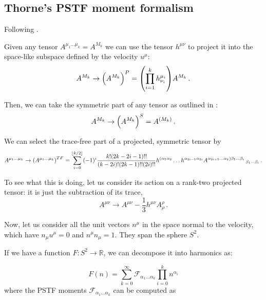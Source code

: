 \documentclass[main.tex]{subfiles}
\begin{document}
\subsection{Thorne's PSTF moment formalism}

Following \cite{Thorne:1981feb}.

Given any tensor \(A^{\mu_1 \dots \mu_k} = A^{M_k}\) we can use the tensor \(h^{\mu\nu}\) to project it into the space-like subspace defined by the velocity \(u^\mu\):
\begin{equation}
    A^{M_k} \rightarrow \qty(A^{M_k})^P
    = \qty(\prod_{i=1}^k h^{\mu_i}_{\nu_i}) A^{M_k} \,.
\end{equation}

Then, we can take the symmetric part of any tensor as outlined in :
\begin{equation}
    A^{M_k} \rightarrow \qty(A^{M_k})^S
    = A^{(M_k)} \,.
\end{equation}

We can select the trace-free part of a projected, symmetric tensor by
\begin{equation}
    A^{\mu_1 \dots \mu_k} \rightarrow \qty(A^{\mu_1 \dots \mu_k})^{TF}
    = \sum _{i=0}   ^{\lfloor k/2 \rfloor}
    (-1)^i \frac{k! (2k-2i-1)!!}{(k-2i)! (2k-1)!! (2i)!!}
    h^{(\alpha_1 \alpha_2} \dots h^{\alpha_{2i-1} \alpha_{2i}}
    A^{\alpha_{2i+1} \dots \alpha_k) \beta_1 \dots \beta_i}\,_{\beta_1 \dots \beta_i} \,.
\end{equation}

To see what this is doing, let us consider its action on a rank-two projected tensor: it is just the subtraction of its trace,
\begin{equation}
    A^{\mu\nu} \rightarrow A^{\mu\nu} - \frac{1}{3} h^{\mu\nu} A^{\rho}_\rho \,.
\end{equation}

Now, let us consider all the unit vectors \(n^\mu\) in the space normal to the velocity, which have \(n_\mu u^\mu = 0\) and \(n^\mu n_\mu = 1\). They span the sphere \(S^2\).

If we have a function \(F\colon S^2 \rightarrow \mathbb R\), we can decompose it into harmonics as:

\begin{equation}
    F(n) = \sum _{k=0}   ^{\infty}
    \mathscr F_{\alpha_1 \dots \alpha_k} \prod_{i=0}^k n^{\alpha_i}
\end{equation}
where the PSTF moments \(\mathscr F_{\alpha_1 \dots \alpha_k}\) can be computed as
\end{document}
